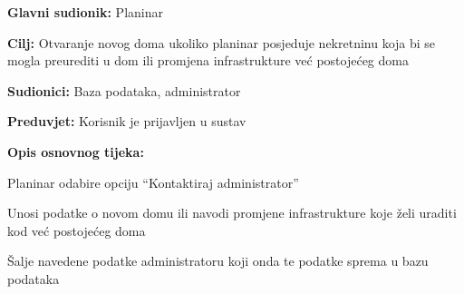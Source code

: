 		\noindent {}
		\begin{packed_item}
			
			\item \textbf{Glavni sudionik: }$ $Planinar$ $
			\item  \textbf{Cilj:} $ $Otvaranje novog doma ukoliko planinar posjeduje nekretninu koja bi se mogla preurediti u dom ili promjena infrastrukture već postojećeg doma $ $
			\item  \textbf{Sudionici:} $ $Baza podataka, administrator $ $
			\item  \textbf{Preduvjet:} $ $Korisnik je prijavljen u sustav $ $
			\item  \textbf{Opis osnovnog tijeka:}
			
			\item[] \begin{packed_enum}
				
				\item $ $Planinar odabire opciju “Kontaktiraj administrator”$ $
				\item $ $Unosi podatke o novom domu ili navodi promjene infrastrukture koje želi uraditi kod već postojećeg doma 
				\item $ $Šalje navedene podatke administratoru koji onda te podatke sprema u bazu podataka $ $
				
			\end{packed_enum}
		\end{packed_item}
	
